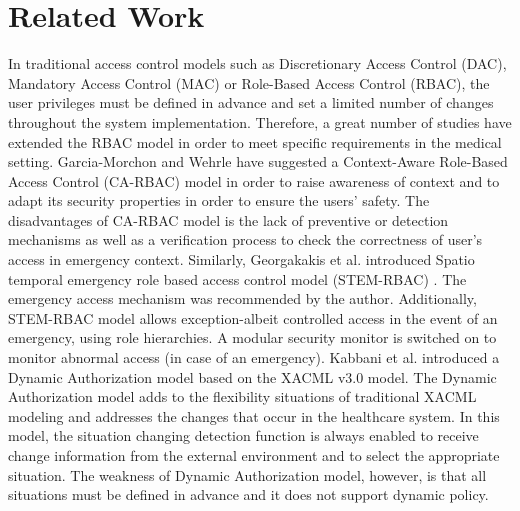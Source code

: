 \documentclass[conference]{IEEEtran}
\begin{document}
\section{Related Work}\label{sec:prior}

In traditional access control models such as Discretionary Access Control (DAC), Mandatory Access Control (MAC) or Role-Based Access Control (RBAC), the user privileges must be defined in advance and set a limited number of changes throughout the system implementation.
Therefore, a great number of studies have extended the RBAC model in order to meet specific requirements in the medical setting. 
Garcia-Morchon and Wehrle  have suggested a Context-Aware Role-Based Access Control (CA-RBAC) model \cite{garcia2010modular} in order to raise awareness of context and to adapt its security properties in order to ensure the users' safety. 
The disadvantages of CA-RBAC model is the lack of preventive or detection mechanisms as well as a verification process to check the correctness of user's access in emergency context.
Similarly, Georgakakis et al. introduced Spatio temporal emergency role based access control model (STEM-RBAC) \cite{georgakakis2011spatio}. 
The emergency access mechanism was recommended by the author.
Additionally, STEM-RBAC model allows exception-albeit controlled access in the event of an emergency, using role hierarchies.
A modular security monitor is switched on to monitor abnormal access (in case of an emergency). 
Kabbani et al. \cite{kabbani2014specification}  introduced a Dynamic Authorization model based on the XACML v3.0 model. 
The Dynamic Authorization model adds to the flexibility situations of traditional XACML modeling and addresses the changes that occur in the healthcare system.
In this model, the situation changing detection function is always enabled to receive change information from the external environment and to select the appropriate situation. 
The weakness of Dynamic Authorization model, however, is that all situations must be defined in advance and it does not support dynamic policy.
\end{document}
